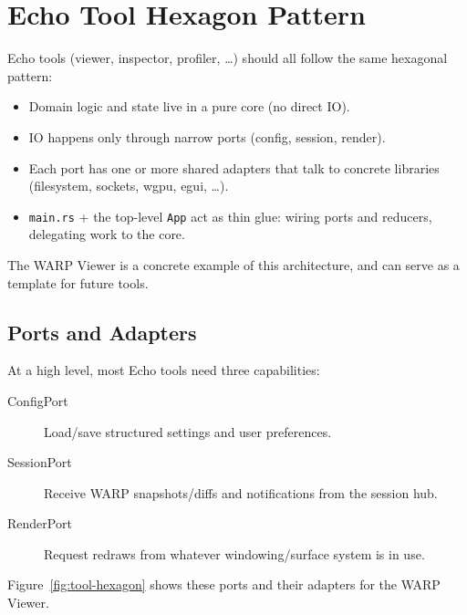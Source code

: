 \section{Echo Tool Hexagon Pattern}
\label{sec:tool-hex-pattern}

Echo tools (viewer, inspector, profiler, \dots) should all follow the same
hexagonal pattern:

\begin{itemize}
  \item Domain logic and state live in a pure core (no direct IO).
  \item IO happens only through narrow ports (config, session, render).
  \item Each port has one or more shared adapters that talk to concrete
        libraries (filesystem, sockets, wgpu, egui, \dots).
  \item \texttt{main.rs} + the top-level \texttt{App} act as thin glue:
        wiring ports and reducers, delegating work to the core.
\end{itemize}

The WARP Viewer is a concrete example of this architecture, and can serve as a
template for future tools.

\subsection{Ports and Adapters}

At a high level, most Echo tools need three capabilities:

\begin{description}
  \item[ConfigPort] Load/save structured settings and user preferences.
  \item[SessionPort] Receive WARP snapshots/diffs and notifications from the
    session hub.
  \item[RenderPort] Request redraws from whatever windowing/surface system is
    in use.
\end{description}

Figure~\ref{fig:tool-hexagon} shows these ports and their adapters for the WARP
Viewer.

